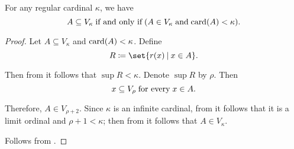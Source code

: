 \begin{proposition}\label{thm:regular_cardinal_stage_inverse_transitivity}
  For any regular cardinal \( \kappa \), we have
  \begin{equation*}
    A \subseteq V_\kappa \T{if and only if} (A \in V_\kappa \T{and} \card(A) < \kappa).
  \end{equation*}
\end{proposition}
\begin{proof}
  \SufficiencySubProof Let \( A \subseteq V_\kappa \) and \( \operatorname{card}(A) < \kappa \). Define
  \begin{equation*}
    R \coloneqq \set{ r(x) \given x \in A }.
  \end{equation*}

  Then from  it follows that \( \sup R < \kappa \). Denote \( \sup R \) by \( \rho \). Then
  \begin{equation*}
    x \subseteq V_\rho \T{for every} x \in A.
  \end{equation*}

  Therefore, \( A \in V_{\rho + 2} \). Since \( \kappa \) is an infinite cardinal, from  it follows that it is a limit ordinal and \( \rho + 1 < \kappa \); then from  it follows that \( A \in V_\kappa \).

  \NecessitySubProof Follows from .
\end{proof}

